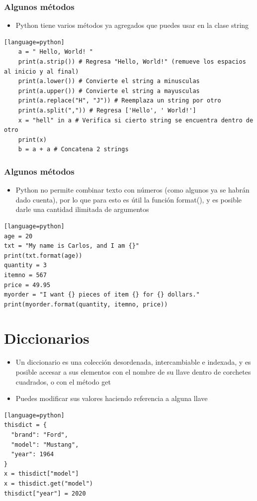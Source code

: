 \documentclass[hyperref={pdfpagelabels=false},xcolor=pst,pdf,fragile]{beamer}
\begin{document}
\begin{frame}[fragile]
    \frametitle{Algunos métodos}
    \pause
    \begin{itemize}
    \item Python tiene varios métodos ya agregados que puedes usar en la clase string
    \end{itemize}
    
    \begin{lstlisting}[basicstyle=\tiny][language=python]
    a = " Hello, World! "
    print(a.strip()) # Regresa "Hello, World!" (remueve los espacios al inicio y al final)
    print(a.lower()) # Convierte el string a minusculas
    print(a.upper()) # Convierte el string a mayusculas
    print(a.replace("H", "J")) # Reemplaza un string por otro
    print(a.split(",")) # Regresa ['Hello', ' World!']
    x = "hell" in a # Verifica si cierto string se encuentra dentro de otro
    print(x)
    b = a + a # Concatena 2 strings
    \end{lstlisting}
\end{frame}

\begin{frame}[fragile]
    \frametitle{Algunos métodos}
    \pause
    \begin{itemize}
    \item Python no permite combinar texto con números (como algunos ya se habrán dado cuenta), por lo que para esto es útil la función format(), y es posible darle una cantidad ilimitada de argumentos
    \end{itemize}
    
    \begin{lstlisting}[basicstyle=\tiny][language=python]
age = 20
txt = "My name is Carlos, and I am {}"
print(txt.format(age))
quantity = 3
itemno = 567
price = 49.95
myorder = "I want {} pieces of item {} for {} dollars."
print(myorder.format(quantity, itemno, price))
    \end{lstlisting}
\end{frame}

\section{Diccionarios}
\begin{frame}[fragile]
    \begin{itemize}
    \item Un diccionario es una colección desordenada, intercambiable e indexada, y es posible accesar a sus elementos con el nombre de su llave dentro de corchetes cuadrados, o con el método get
    \item Puedes modificar sus valores haciendo referencia a alguna llave
    \end{itemize}
        \begin{lstlisting}[basicstyle=\tiny][language=python]
thisdict = {
  "brand": "Ford",
  "model": "Mustang",
  "year": 1964
}
x = thisdict["model"]
x = thisdict.get("model")
thisdict["year"] = 2020
    \end{lstlisting}
\end{frame}
\end{document}
